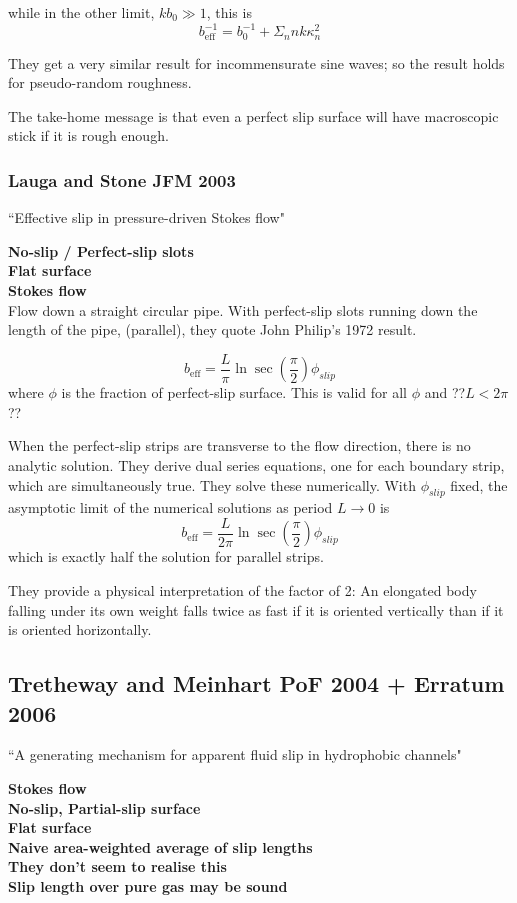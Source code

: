 \documentclass{article}
\begin{document}
while in the other limit, $kb_{0} \gg 1$, this is
\[  b_{\mathrm{eff}}^{-1} = b_{0}^{-1} + \Sigma_{n} nk \kappa_{n}^{2}\]

They get a very similar result for incommensurate sine waves; so the result holds for pseudo-random roughness.

The take-home message is that even a perfect slip surface will have macroscopic stick if it is rough enough.



\subsubsection*{Lauga and Stone JFM 2003}
``Effective slip in pressure-driven Stokes flow"

\textbf{No-slip / Perfect-slip slots}\\
\textbf{Flat surface}\\
\textbf{Stokes flow}\\

Flow down a straight circular pipe. With perfect-slip slots running down the length of the pipe, (parallel), they quote John Philip's 1972 result.
 
 \[ b_{\mathrm{eff}} = \frac{L}{\pi} \ln \sec ( \frac{\pi}{2}) \phi_{slip} \]
where $\phi$ is the fraction of perfect-slip surface.  This is valid for all $\phi$ and ??$L<2\pi$ ??

When the perfect-slip strips are transverse to the flow direction, there is no analytic solution.  They derive dual series equations, one for each boundary strip, which are simultaneously true.  They solve these numerically.
With $\phi_{slip}$ fixed, the asymptotic limit of the numerical solutions as period $L \rightarrow 0$ is
\[ b_{\mathrm{eff}} = \frac{L}{2 \pi} \ln \sec ( \frac{\pi}{2}) \phi_{slip} \]
which is exactly half the solution for parallel strips.

They provide a physical interpretation of the factor of 2: An elongated body falling under its own weight falls twice as fast if it is oriented vertically than if it is oriented horizontally.



\subsection*{Tretheway and Meinhart PoF 2004 + Erratum 2006}
``A generating mechanism for apparent fluid slip in hydrophobic channels"

\textbf{Stokes flow}\\
\textbf{No-slip, Partial-slip surface}\\
\textbf{Flat surface}\\
\textbf{Naive area-weighted average of slip lengths}\\
\textbf{They don't seem to realise this}\\
\textbf{Slip length over pure gas may be sound}
\end{document}
